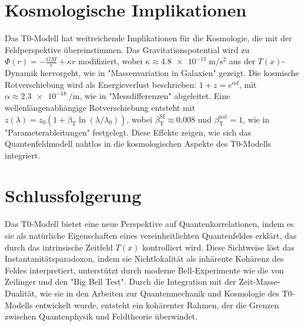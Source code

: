 \documentclass[a4paper,12pt]{article}
\newcommand{\Tfield}{T(x)}
\newcommand{\betaT}{\beta_{\text{T}}}
\theoremstyle{definition}
\theoremstyle{remark}
\begin{document}
	\section{Kosmologische Implikationen}
	
	Das T0-Modell hat weitreichende Implikationen für die Kosmologie, die mit der Feldperspektive übereinstimmen. Das Gravitationspotential wird zu \(\Phi(r) = -\frac{G M}{r} + \kappa r\) modifiziert, wobei \(\kappa \approx \SI{4.8e-11}{\meter\per\second\squared}\) aus der \(\Tfield\)-Dynamik hervorgeht, wie in "Massenvariation in Galaxien" \cite{pascher_galaxies_2025} gezeigt. Die kosmische Rotverschiebung wird als Energieverlust beschrieben: \(1 + z = e^{\alpha d}\), mit \(\alpha \approx \SI{2.3e-18}{\per\meter}\), wie in "Messdifferenzen" \cite{pascher_messdifferenzen_2025} abgeleitet. Eine wellenlängenabhängige Rotverschiebung entsteht mit \(z(\lambda) = z_0 (1 + \betaT \ln(\lambda/\lambda_0))\), wobei \(\betaT^{\text{SI}} \approx 0.008\) und \(\betaT^{\text{nat}} = 1\), wie in "Parameterableitungen" \cite{pascher_params_2025} festgelegt. Diese Effekte zeigen, wie sich das Quantenfeldmodell nahtlos in die kosmologischen Aspekte des T0-Modells integriert.
	
	\section{Schlussfolgerung}
	
	Das T0-Modell bietet eine neue Perspektive auf Quantenkorrelationen, indem es sie als natürliche Eigenschaften eines vereinheitlichten Quantenfeldes erklärt, das durch das intrinsische Zeitfeld \(\Tfield\) kontrolliert wird. Diese Sichtweise löst das Instantanitätsparadoxon, indem sie Nichtlokalität als inhärente Kohärenz des Feldes interpretiert, unterstützt durch moderne Bell-Experimente wie die von Zeilinger und den "Big Bell Test". Durch die Integration mit der Zeit-Masse-Dualität, wie sie in den Arbeiten zur Quantenmechanik und Kosmologie des T0-Modells entwickelt wurde, entsteht ein kohärenter Rahmen, der die Grenzen zwischen Quantenphysik und Feldtheorie überwindet.
	
\end{document}
